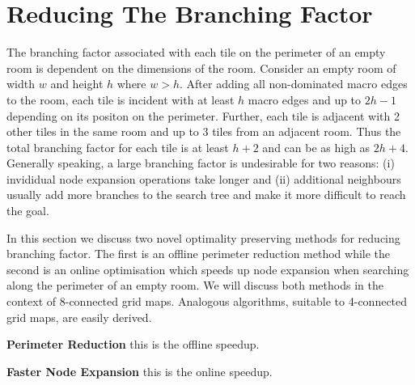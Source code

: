 \section{Reducing The Branching Factor}
The branching factor associated with each tile on the perimeter of an empty room is dependent
on the dimensions of the room.
Consider an empty room of width $w$ and height $h$ where $w > h$.
After adding all non-dominated macro edges to the room, each tile is incident with at least $h$ macro edges and up to $2h-1$ 
depending on its positon on the perimeter.
Further, each tile is adjacent with 2 other tiles in the same room and up to 3 tiles from an adjacent room.
Thus the total branching factor for each tile is at least $h + 2$ and can be as high
as $2h + 4$.
Generally speaking, a large branching factor is undesirable for two reasons:
(i) invididual node expansion operations take longer and (ii) additional neighbours usually 
add more branches to the search tree and make it more difficult to reach the goal.
\par
In this section we discuss two novel optimality preserving methods for reducing branching factor. 
The first is an offline perimeter reduction method while the second is an online optimisation which speeds up 
node expansion when searching along the perimeter of an empty room.
We will discuss both methods in the context of 8-connected grid maps.
Analogous algorithms, suitable to 4-connected grid maps, are easily derived.
\par \noindent \newline
\textbf{Perimeter Reduction} this is the offline speedup. 
\par \noindent \newline
\textbf{Faster Node Expansion} this is the online speedup.

